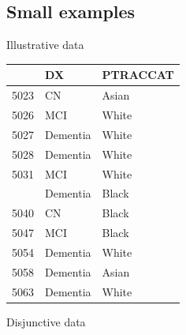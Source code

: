 \documentclass[
  ignorenonframetext,
]{beamer}
\begin{document}
\hypertarget{small-examples}{%
\subsection{Small examples}\label{small-examples}}

\begin{frame}{Illustrative data}
\protect\hypertarget{illustrative-data}{}

\begin{table}[H]
\centering\begingroup\fontsize{10}{12}\selectfont

\begin{tabular}{lll}
\toprule
  & DX & PTRACCAT\\
\midrule
5023 & CN & Asian\\
5026 & MCI & White\\
5027 & Dementia & White\\
5028 & Dementia & White\\
5031 & MCI & White\\
\addlinespace
5037 & Dementia & Black\\
5040 & CN & Black\\
5047 & MCI & Black\\
5054 & Dementia & White\\
5058 & Dementia & Asian\\
5063 & Dementia & White\\
\bottomrule
\end{tabular}\endgroup{}
\end{table}

\end{frame}

\begin{frame}{Disjunctive data}
\protect\hypertarget{disjunctive-data}{}

\begin{table}[H]
\centering
{}
\end{table}

\end{frame}
\end{document}
